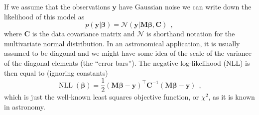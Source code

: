\documentclass[12pt,dvipsnames]{report}
\renewcommand{\vec}[1]{\boldsymbol{\mathbf{#1}}}
\newcommand{\hquad}{~~}
\begin{document}
If we assume that the observations
$\vec{y}$ have Gaussian noise we can write down the likelihood of this model as
\begin{equation}
    p(\vec{y}\lvert \vec \beta)=\mathcal{N}(\vec{y}\lvert\vec{M}\vec \beta, \vec{C})
    \hquad,
\end{equation}
where $\vec{C}$ is the data covariance matrix and $\mathcal{N}$ is shorthand notation for
the multivariate normal distribution. In an astronomical application, it is usually
assumed to be diagonal and we might have some idea of the scale of the variance
of the diagonal elements (the ``error bars'').
The negative log-likelihood (NLL) is then equal to (ignoring constants)
\begin{equation}
    \operatorname{NLL}(\vec \beta)=\frac{1}{2}(\vec{M} \vec\beta -\vec{y})^{\intercal}\vec{C}^{-1}(\vec{M} \vec\beta-\vec{y})
    \hquad,
\end{equation}
which is just the well-known least squares objective function, or $\chi^2$, as it is known
in astronomy.
\end{document}
